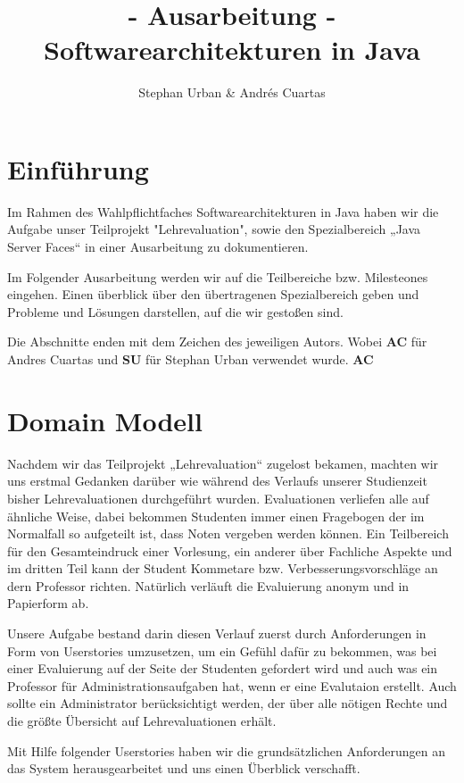 \documentclass[titlepage, 12pt,a4paper]{scrartcl}
\author{Stephan Urban \& Andrés Cuartas}
\title{- Ausarbeitung - \\ Softwarearchitekturen in Java \\}
\begin{document}
 

\maketitle

\newpage
\tableofcontents
\newpage

\section{Einführung}
Im Rahmen des Wahlpflichtfaches Softwarearchitekturen in Java haben wir die
Aufgabe unser Teilprojekt "Lehrevaluation", sowie den Spezialbereich 
„Java Server Faces“ in einer Ausarbeitung zu dokumentieren. 

Im Folgender Ausarbeitung werden wir auf die Teilbereiche bzw. Milesteones
eingehen. Einen überblick über den übertragenen Spezialbereich geben und
Probleme und Lösungen darstellen, auf die wir gestoßen sind. 

Die Abschnitte enden mit dem Zeichen des jeweiligen Autors. Wobei {\bf{AC}} für Andres
Cuartas und {\bf{SU}} für Stephan Urban verwendet wurde.
{\bf{AC}}
\section{Domain Modell}
Nachdem wir das Teilprojekt „Lehrevaluation“ zugelost bekamen, machten wir uns
erstmal Gedanken darüber wie während des Verlaufs unserer Studienzeit bisher
Lehrevaluationen durchgeführt wurden. Evaluationen verliefen alle auf ähnliche
Weise, dabei bekommen Studenten immer einen Fragebogen der im Normalfall so
aufgeteilt ist, dass Noten vergeben werden können. Ein Teilbereich für den
Gesamteindruck einer Vorlesung, ein anderer über Fachliche Aspekte und im
dritten Teil kann der Student Kommetare bzw. Verbesserungsvorschläge an dern
Professor richten. Natürlich verläuft die Evaluierung anonym und in Papierform
ab.

Unsere Aufgabe bestand darin diesen Verlauf zuerst durch Anforderungen in Form
von Userstories umzusetzen, um ein Gefühl dafür zu bekommen, was bei einer
Evaluierung auf der Seite der Studenten gefordert wird und auch was ein
Professor für Administrationsaufgaben hat, wenn er eine  Evalutaion erstellt.
Auch sollte ein Administrator berücksichtigt werden, der über alle nötigen
Rechte und die größte Übersicht auf Lehrevaluationen erhält. 

Mit Hilfe folgender Userstories haben wir die grundsätzlichen Anforderungen an
das System herausgearbeitet und uns einen Überblick verschafft.  
\end{document}
